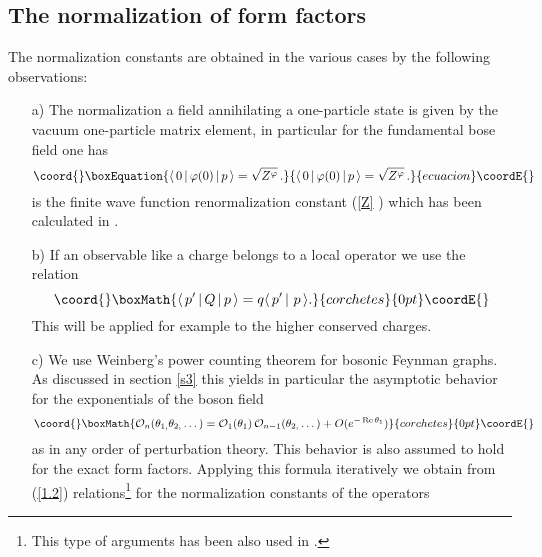 \documentclass[a4paper,a4paper]{article}
\begin{document}
\subsection{The normalization of form factors}

The normalization constants are obtained in the various cases by the
following observations:

\begin{enumerate}
\item[a)]  The normalization a field annihilating a one-particle state is
given by the vacuum one-particle matrix element, in particular for the
fundamental bose field one has 
\begin{equation}\coord{}\boxEquation{
\langle \,0\,|\,\varphi (0)\,|\,p\,\rangle =\sqrt{Z^{\varphi }}\,.
\label{Na}
}{
\langle \,0\,|\,\varphi (0)\,|\,p\,\rangle =\sqrt{Z^{\varphi }}\,.
}{ecuacion}\coordE{}\end{equation}
\coordHE{} is the finite wave function renormalization constant (\ref{Z}%
) which has been calculated in \cite{KW}.

\item[b)]  If an observable like a charge \coordHE{}
belongs to a local operator we use the relation 
\[\coord{}\boxMath{
\langle \,p^{\prime }\,|\,Q\,|\,p\,\rangle =q\langle \,p^{\prime
}\,|\,\,p\,\rangle . 
}{corchetes}{0pt}\coordE{}\]
This will be applied for example to the higher conserved charges.

\item[c)]  We use Weinberg's power counting theorem for bosonic Feynman
graphs. As discussed in section \ref{s3} this yields in particular the
asymptotic behavior for the exponentials of the boson field \coordHE{} 
\[\coord{}\boxMath{
\mathcal{O}_{n}(\theta _{1,}\theta _{2,}\dots )=\mathcal{O}_{1}(\theta
_{1})\,\mathcal{O}_{n-1}(\theta _{2,}\dots )+O(e^{-\mathop{\rm Re}\theta
_{1}}) 
}{corchetes}{0pt}\coordE{}\]
as \coordHE{} in any order of
perturbation theory. This behavior is also assumed to hold for the exact
form factors. Applying this formula iteratively we obtain from (\ref{1.2})
relations\footnote{%
This type of arguments has been also used in \cite{KW,FMS,KM,MS}.} for the
normalization constants of the operators \coordHE{}


\end{enumerate}
\end{document}
